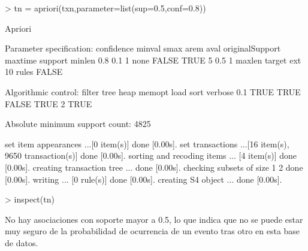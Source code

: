 \documentclass [a4paper] {article}
\begin{document}
\begin{Schunk}
\begin{Sinput}
> tn = apriori(txn,parameter=list(sup=0.5,conf=0.8))
\end{Sinput}
\begin{Soutput}
Apriori

Parameter specification:
 confidence minval smax arem  aval originalSupport maxtime support minlen
        0.8    0.1    1 none FALSE            TRUE       5     0.5      1
 maxlen target   ext
     10  rules FALSE

Algorithmic control:
 filter tree heap memopt load sort verbose
    0.1 TRUE TRUE  FALSE TRUE    2    TRUE

Absolute minimum support count: 4825 

set item appearances ...[0 item(s)] done [0.00s].
set transactions ...[16 item(s), 9650 transaction(s)] done [0.00s].
sorting and recoding items ... [4 item(s)] done [0.00s].
creating transaction tree ... done [0.00s].
checking subsets of size 1 2 done [0.00s].
writing ... [0 rule(s)] done [0.00s].
creating S4 object  ... done [0.00s].
\end{Soutput}
\begin{Sinput}
> inspect(tn)
\end{Sinput}
\end{Schunk}
No hay asociaciones con soporte mayor a 0.5, lo que indica que no se puede estar muy seguro de la probabilidad de 
ocurrencia de un evento tras otro en esta base de datos. 
\end{document}
